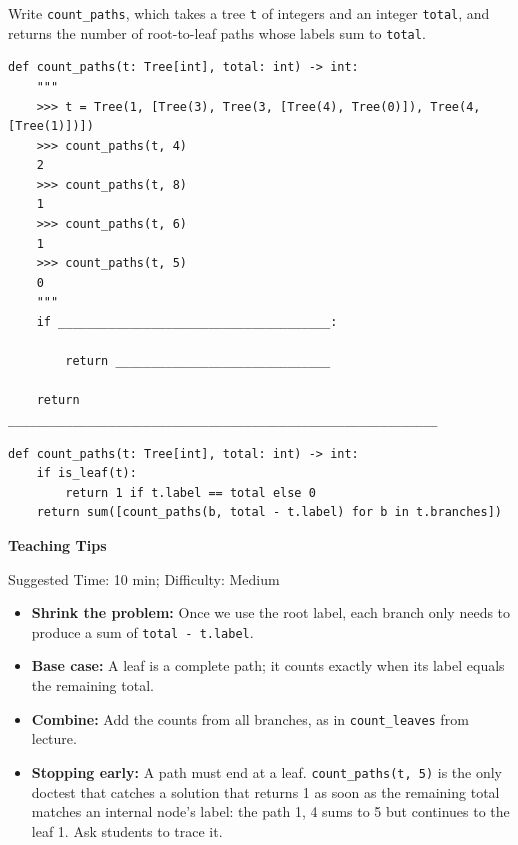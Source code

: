 \begin{blocksection}
\question Write \lstinline{count_paths}, which takes a tree \lstinline{t} of integers and an integer \lstinline{total}, and returns the number of root-to-leaf paths whose labels sum to \lstinline{total}.

\begin{lstlisting}
def count_paths(t: Tree[int], total: int) -> int:
    """
    >>> t = Tree(1, [Tree(3), Tree(3, [Tree(4), Tree(0)]), Tree(4, [Tree(1)])])
    >>> count_paths(t, 4)
    2
    >>> count_paths(t, 8)
    1
    >>> count_paths(t, 6)
    1
    >>> count_paths(t, 5)
    0
    """
    if ______________________________________:

        return ______________________________

    return ____________________________________________________________
\end{lstlisting}
\begin{solution}[1in]
\begin{lstlisting}
def count_paths(t: Tree[int], total: int) -> int:
    if is_leaf(t):
        return 1 if t.label == total else 0
    return sum([count_paths(b, total - t.label) for b in t.branches])
\end{lstlisting}
\end{solution}
\end{blocksection}

\begin{questionmeta}
\textbf{Teaching Tips}\par\nopagebreak[4]
Suggested Time: 10 min; Difficulty: Medium
\nopagebreak[4]
\begin{itemize}
    \item \textbf{Shrink the problem:} Once we use the root label, each branch only needs to produce a sum of \lstinline{total - t.label}.
    \item \textbf{Base case:} A leaf is a complete path; it counts exactly when its label equals the remaining total.
    \item \textbf{Combine:} Add the counts from all branches, as in \lstinline{count_leaves} from lecture.
    \item \textbf{Stopping early:} A path must end at a leaf. \lstinline{count_paths(t, 5)} is the only doctest that catches a solution that returns 1 as soon as the remaining total matches an internal node's label: the path 1, 4 sums to 5 but continues to the leaf 1. Ask students to trace it.
\end{itemize}
\end{questionmeta}
